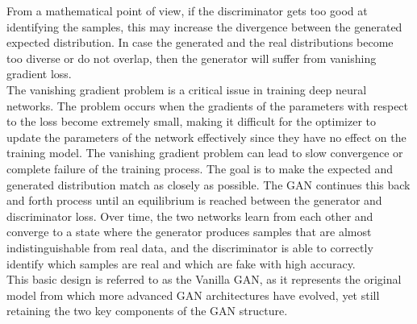 \noindent From a mathematical point of view, if the discriminator gets too good at identifying the samples, this may increase the divergence between the generated expected distribution. In case the generated and the real distributions become too diverse or do not overlap, then the generator will suffer from vanishing gradient loss. \\
The vanishing gradient problem is a critical issue in training deep neural networks. The problem occurs when the gradients of the parameters with respect to the loss become extremely small, making it difficult for the optimizer to update the parameters of the network effectively since they have no effect on the training model. The vanishing gradient problem can lead to slow convergence or complete failure of the training process. The goal is to make the expected and generated distribution match as closely as possible. 
The GAN continues this back and forth process until an equilibrium is reached between the generator and discriminator loss. Over time, the two networks learn from each other and converge to a state where the generator produces samples that are almost indistinguishable from real data, and the discriminator is able to correctly identify which samples are real and which are fake with high accuracy.
 \\
This basic design is referred to as the Vanilla GAN, as it represents the original model from which more advanced GAN architectures have evolved, yet still retaining the two key components of the GAN structure.
